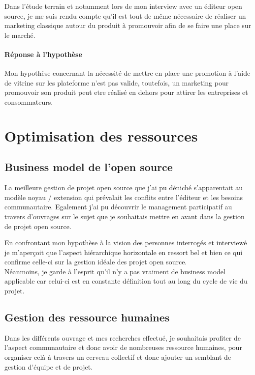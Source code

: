 		Dans l'étude terrain et notamment lors de mon interview avec un éditeur open source, je me suis rendu compte qu'il est tout de même nécessaire de réaliser un marketing classique autour du produit à promouvoir afin de se faire une place sur le marché.

\paragraph{Réponse à l'hypothèse\\}

	Mon hypothèse concernant la nécessité de mettre en place une promotion à l'aide de vitrine sur les plateforme n'est pas valide, toutefois, un marketing pour promouvoir son produit peut etre réalisé en dehors pour attirer les entreprises et consommateurs.

\section{Optimisation des ressources}

	\subsection{Business model de l'open source}

		La meilleure gestion de projet open source que j'ai pu déniché s'apparentait au modèle noyau / extension qui prévalait les conflits entre l'éditeur et les besoins communautaire. Egalement j'ai pu découvrir le management participatif au travers d'ouvrages sur le sujet que je souhaitais mettre en avant dans la gestion de projet open source.

		En confrontant mon hypothèse à la vision des personnes interrogés et interviewé je m'aperçoit que l'aspect hiérarchique horizontale en ressort bel et bien ce qui confirme celle-ci sur la gestion idéale des projet open source. \\

		Néanmoins, je garde à l'esprit qu'il n'y a pas vraiment de business model applicable car celui-ci est en constante définition tout au long du cycle de vie du projet.

	\subsection{Gestion des ressource humaines}

		Dans les différents ouvrage et mes recherches effectué, je souhaitais profiter de l'aspect communautaire et donc avoir de nombreuses ressource humaines, pour organiser celà à travers un cerveau collectif et donc ajouter un semblant de gestion d'équipe et de projet.\\


